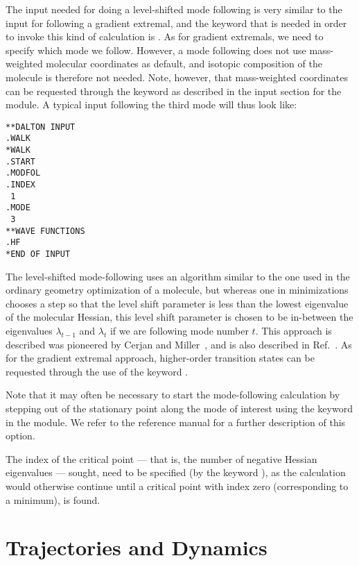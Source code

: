 The input needed for doing a level-shifted mode following is very
similar to the input for following a gradient extremal, and the
keyword that is needed in order to invoke this kind of calculation is
. As for gradient extremals, we need to specify which
mode we follow. However, a mode following does not use mass-weighted
molecular coordinates as default, and
isotopic composition of the
molecule is therefore not needed. Note, however, that mass-weighted
coordinates can be requested through the keyword  as
described in the input section for the  module. A typical
input following the third mode will thus look like:

\begin{verbatim}
**DALTON INPUT
.WALK
*WALK
.START
.MODFOL
.INDEX
 1
.MODE
 3
**WAVE FUNCTIONS
.HF
*END OF INPUT
\end{verbatim}

The level-shifted mode-following uses an algorithm similar to the
one used in the ordinary geometry optimization of a molecule, but
whereas one in minimizations chooses a step so that the level
shift parameter is less than the lowest eigenvalue of the
molecular Hessian, this level shift parameter is
chosen to be in-between the eigenvalues $\lambda_{t-1}$ and
$\lambda_{t}$ if we are following mode number $t$. This approach
is described was pioneered by Cerjan and
Miller~\cite{cjcwhmjcp75}, and is also described in
Ref.~\cite{hjajpjthjcp85}. As for the gradient extremal approach,
higher-order transition states can be
requested through the use of the keyword .

Note that it may often be necessary to start the mode-following
calculation by stepping out of the stationary point along the
mode of interest using the keyword  in the
 module. We refer to the reference manual for a further
description of this option.

The index of the critical point  --- that is,
the number of negative Hessian eigenvalues
--- sought, need to
be specified (by the keyword ), as the calculation would
otherwise continue until a critical point with index zero
(corresponding to a minimum), is found.

\section{Trajectories and Dynamics}

